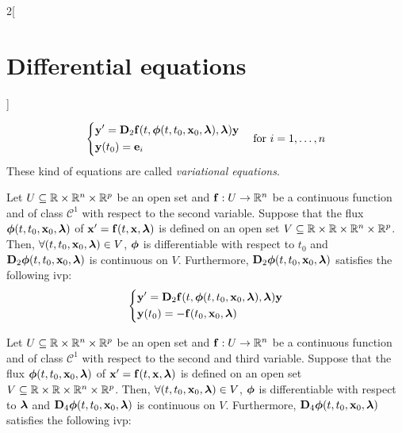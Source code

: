 \documentclass[../../../main.tex]{subfiles}
\begin{document}
\begin{multicols}{2}[\section{Differential equations}]
\begin{theorem}
    $$
      \left\{
      \begin{aligned}
         & \boldsymbol{\mathrm{y}}'      =\boldsymbol{\mathrm{D}}_2\boldsymbol{\mathrm{f}}(t,\boldsymbol{\mathrm{\phi}}(t,t_0,\boldsymbol{\mathrm{x}}_0,\boldsymbol{\mathrm{\lambda}}),\boldsymbol{\mathrm{\lambda}})\boldsymbol{\mathrm{y}} \\
         & \boldsymbol{\mathrm{y}}(t_0)  =\boldsymbol{\mathrm{e}}_i
      \end{aligned}
      \right.\quad\text{for }i=1,\ldots,n
    $$
    These kind of equations are called \textit{variational equations}.
  \end{theorem}
  \begin{theorem}[Dependence on $t_0$]
    Let $U\subseteq\mathbb{R}\times\mathbb{R}^n\times\mathbb{R}^p$ be an open set and $\boldsymbol{\mathrm{f}}:U\rightarrow\mathbb{R}^n$ be a continuous function and of class $\mathcal{C}^1$ with respect to the second variable. Suppose that the flux $\boldsymbol{\mathrm{\phi}}(t,t_0,\boldsymbol{\mathrm{x}}_0,\boldsymbol{\mathrm{\lambda}})$ of $\boldsymbol{\mathrm{x}}'=\boldsymbol{\mathrm{f}}(t,\boldsymbol{\mathrm{x}},\boldsymbol{\mathrm{\lambda}})$ is defined on an open set $V\subseteq\mathbb{R}\times\mathbb{R}\times\mathbb{R}^n\times\mathbb{R}^p$. Then, $\forall (t,t_0,\boldsymbol{\mathrm{x}}_0,\boldsymbol{\mathrm{\lambda}})\in V$, $\boldsymbol{\mathrm{\phi}}$ is differentiable with respect to $t_0$ and $\boldsymbol{\mathrm{D}}_2\boldsymbol{\mathrm{\phi}}(t,t_0,\boldsymbol{\mathrm{x}}_0,\boldsymbol{\mathrm{\lambda}})$ is continuous on $V$. Furthermore, $\boldsymbol{\mathrm{D}}_2\boldsymbol{\mathrm{\phi}}(t,t_0,\boldsymbol{\mathrm{x}}_0,\boldsymbol{\mathrm{\lambda}})$ satisfies the following ivp:
    \begin{equation*}
      \left\{
      \begin{aligned}
         & \boldsymbol{\mathrm{y}}'      =\boldsymbol{\mathrm{D}}_2\boldsymbol{\mathrm{f}}(t,\boldsymbol{\mathrm{\phi}}(t,t_0,\boldsymbol{\mathrm{x}}_0,\boldsymbol{\mathrm{\lambda}}),\boldsymbol{\mathrm{\lambda}})\boldsymbol{\mathrm{y}} \\
         & \boldsymbol{\mathrm{y}}(t_0)  = -\boldsymbol{\mathrm{f}}(t_0,\boldsymbol{\mathrm{x}}_0,\boldsymbol{\mathrm{\lambda}})
      \end{aligned}
      \right.
    \end{equation*}
  \end{theorem}
  \begin{theorem}
    Let $U\subseteq\mathbb{R}\times\mathbb{R}^n\times\mathbb{R}^p$ be an open set and $\boldsymbol{\mathrm{f}}:U\rightarrow\mathbb{R}^n$ be a continuous function and of class $\mathcal{C}^1$ with respect to the second and third variable. Suppose that the flux $\boldsymbol{\mathrm{\phi}}(t,t_0,\boldsymbol{\mathrm{x}}_0,\boldsymbol{\mathrm{\lambda}})$ of $\boldsymbol{\mathrm{x}}'=\boldsymbol{\mathrm{f}}(t,\boldsymbol{\mathrm{x}},\boldsymbol{\mathrm{\lambda}})$ is defined on an open set $V\subseteq\mathbb{R}\times\mathbb{R}\times\mathbb{R}^n\times\mathbb{R}^p$. Then, $\forall (t,t_0,\boldsymbol{\mathrm{x}}_0,\boldsymbol{\mathrm{\lambda}})\in V$, $\boldsymbol{\mathrm{\phi}}$ is differentiable with respect to $\boldsymbol{\mathrm{\lambda}}$ and $\boldsymbol{\mathrm{D}}_4\boldsymbol{\mathrm{\phi}}(t,t_0,\boldsymbol{\mathrm{x}}_0,\boldsymbol{\mathrm{\lambda}})$ is continuous on $V$. Furthermore, $\boldsymbol{\mathrm{D}}_4\boldsymbol{\mathrm{\phi}}(t,t_0,\boldsymbol{\mathrm{x}}_0,\boldsymbol{\mathrm{\lambda}})$ satisfies the following ivp:

\end{theorem}
\end{multicols}
\end{document}
